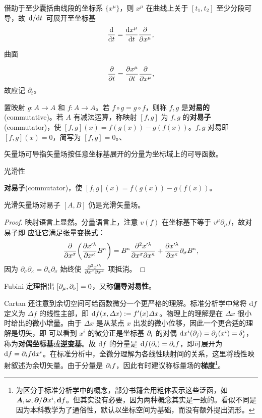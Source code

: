 \begin{theorem}
\end{theorem}

借助于至少囊括曲线段的坐标系 $\{x^\mu\}$，则 $x^\mu$ 在曲线上关于 $[t_1,t_2]$ 至少分段可导，故 $\dv*{t}$ 可展开至坐标基
    \[\dv{t}=\dv{x^\mu}{t}\pdv{x^\mu},\]

曲面

\[
        \pdv{t}=\pdv{x^\mu}{t}\pdv{x^\mu},
    \]
    故应记 $\partial_t$。

置映射 $g:A\to A$ 和 $f:A\to A$。若 $f\circ g=g\circ f$，则称 $f,g$ 是\textbf{对易的}(commutative)。若 $A$ 有减法运算，称映射 $[f,g]$ 为 $f,g$ 的\textbf{对易子}(commutator)，使 $[f,g](x)=f(g(x))-g(f(x))$。$f,g$ 对易即 $[f,g](x)=0$，简写为 $[f,g]=0$。、

矢量场可导指矢量场按任意坐标基展开的分量为坐标域上的可导函数。

光滑性

\begin{definition}
    \textbf{对易子}(commutator)，使 $[f,g](x)=f(g(x))-g(f(x))$。
\end{definition}


\begin{theorem}
    光滑矢量场对易子 $[A,B]$ 仍是光滑矢量场。
\end{theorem}
\begin{proof}
    映射语言上显然。分量语言上，注意 $v(f)$ 在坐标基下等于 $v^\mu\partial_\mu f$，故对易子即
    应证它满足张量变换式：
    \[
        \pdv{x^\sigma}(\pdv{x'^\lambda}{x^\kappa}B^\kappa)=  B^\kappa\pdv{x'^\lambda}{x^\sigma}{x^\kappa}+\pdv{x'^\lambda}{x^\kappa}\partial_\sigma B^\kappa,
    \]
    因为 $\partial_\sigma\partial_\kappa=\partial_\kappa\partial_\sigma$ 始终使 $\pdv{x'^\lambda}{x^\sigma}{x^\kappa}$ 项抵消。
\end{proof}

\begin{eg}
    Fubini 定理指出 $\left[\partial_\mu,\partial_\nu\right]=0$，又称\textbf{偏导对易性}。
\end{eg}


Cartan 还注意到余切空间可给函数微分一个更严格的理解。标准分析学中常将 $\dd f$ 定义为 $\Delta f$ 的线性主部，即 $\dd f(x,\Delta x):=f'(x)\Delta x$。物理上的理解是在 $\Delta x$ 很小时给出的微小增量。由于 $\Delta x$ 是从某点 $x$ 出发的微小位移，因此一个更合适的理解是切矢，即
可以看到 $x^i$ 的微分正是坐标基 $\partial_i$ 的对偶 $\dd x^i(\partial_j)=\partial_j(x^i)=\delta^i_j$，称为\textbf{对偶坐标基}或\textbf{逆变基}。故 $\dd f$ 的分量是 $\dd f(\partial_i)=\partial_i f$，即可展开为 $\dd f=\partial_i f \dd x^i$。在标准分析中，全微分理解为各线性映射间的关系，这里将线性映射叙述为余切矢量。由于分量是 $\partial_i f$，因此有时建议称标量场的\textbf{梯度}\footnote{为区分于标准分析学中的概念，部分书籍会用粗体表示这些泛函，如 $\vb* A,\vb*\omega,\vb*{\partial}/{\vb*{\partial}x^i},\vb*{\dd}f$。但其实没有必要，因为两种概念其实是一致的。看似不同是因为本科教学为了通俗性，默认以坐标空间为基础，而没有额外提出流形。}。


